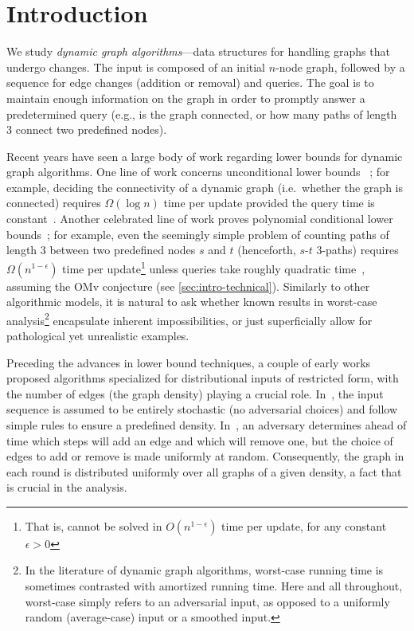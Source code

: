 \documentclass[letter,11pt]{article}
\newcommand{\omv}{\textnormal{\textsf{OMv}}\xspace}
\newcommand{\paths}[3]{${#1}$-${#2}$ ${#3}$-paths\xspace}
\begin{document}
\newpage


\section{Introduction}
We study \emph{dynamic graph algorithms}---data structures for handling graphs that undergo changes. 
The input is composed of an initial $n$-node graph, followed by a sequence for edge changes (addition or removal) and queries.
The goal is to maintain enough information on the graph in order to promptly answer a predetermined query (e.g., is the graph connected,
or how many paths of length~$3$ connect two predefined nodes).

Recent years have seen a large body of work regarding lower bounds for dynamic graph algorithms.
One line of work concerns unconditional lower bounds ~\cite{PatrascuT11a,CliffordGL15,LarsenY23,PatrascuD06};
for example, deciding the connectivity of a dynamic graph (i.e.\ whether the graph is connected) requires $\Omega(\log n)$ time per update provided the query time is constant~\cite{PatrascuD06}.
Another celebrated line of work proves  polynomial conditional lower bounds~\cite{HenzingerKNS15,AbboudW14,Patrascu10,DorHZ00,RodittyZ11,KopelowitzPP16};
for example, even the seemingly simple problem of counting paths of length 3 between two predefined nodes $s$ and $t$ (henceforth, \paths{s}{t}{3}) requires $\Omega(n^{1-\epsilon})$ time per update\footnote{%
That is, cannot be solved in $O(n^{1-\epsilon})$ time per update, for any constant $\epsilon>0$}
unless queries take roughly quadratic time~\cite{HenzingerKNS15},
assuming the \omv conjecture (see \cref{sec:intro-technical}).
Similarly to other algorithmic models, it is natural to ask whether known results in worst-case analysis\footnote{%
    In the literature of dynamic graph algorithms, 
    worst-case running time is sometimes contrasted with amortized running time. 
    Here and all throughout, worst-case simply refers to an adversarial input, as opposed to a uniformly random (average-case) input or a smoothed input.
    }
encapsulate inherent impossibilities, or just superficially allow for pathological
yet unrealistic
examples. 

Preceding the advances in lower bound techniques, a couple of early works proposed algorithms specialized for distributional inputs of restricted form, with the number of edges (the graph density) playing a crucial role.
In~\cite{NikoletseasRSY95}, the input sequence is assumed to be entirely stochastic (no adversarial choices) and follow simple rules to ensure 
a predefined density.
In~\cite{AlbertsH98}, an adversary determines ahead of time which steps will add an edge and which will remove one, but the choice of edges to add or remove is made uniformly at random.
Consequently, the graph in each round is distributed uniformly over all graphs of a given density,
a fact that is crucial in the analysis.
\end{document}
